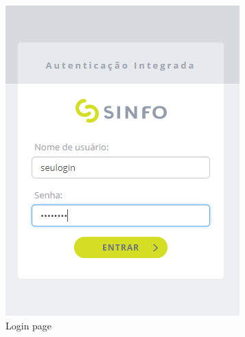 \begin{figure}[!htb]
   \begin{minipage}{0.48\textwidth}
     \centering
     \includegraphics[width=.9\linewidth]{Imagens/login.png}
     \caption{Login page}\label{fig:login}
   \end{minipage}\hfill
   \begin{minipage}{0.48\textwidth}
     \centering

\end{minipage}
\end{figure}
